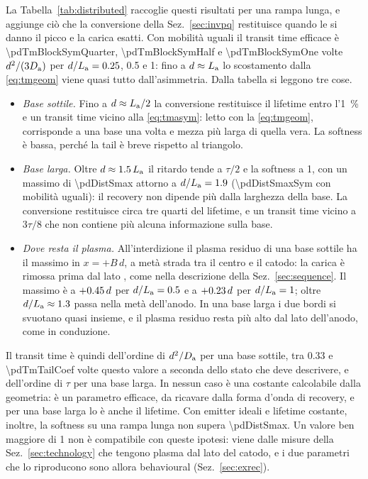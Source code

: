 \documentclass[10pt,a4paper]{scrartcl}
\let\newcommand\pdvaluedefine
\newcommand{\Da}{D_\mathrm{a}}
\newcommand{\La}{L_\mathrm{a}}
\newcommand{\Pp}{p\textsuperscript{+}}
\begin{document}
La Tabella~\ref{tab:distributed} raccoglie questi risultati per una rampa lunga, e aggiunge ciò che la conversione della Sez.~\ref{sec:invpq} restituisce quando le si danno il picco e la carica esatti. Con mobilità uguali il transit time efficace è \num{\pdTmBlockSymQuarter}, \num{\pdTmBlockSymHalf} e \num{\pdTmBlockSymOne} volte $d^2/(3\Da)$ per $d/\La = \num{0.25}$, \num{0.5} e 1: fino a $d \approx \La$ lo scostamento dalla \eqref{eq:tmgeom} viene quasi tutto dall'asimmetria. Dalla tabella si leggono tre cose.
\begin{itemize}
\item \emph{Base sottile.} Fino a $d \approx \La/2$ la conversione restituisce il lifetime entro l'\SI{1}{\percent} e un transit time vicino alla \eqref{eq:tmasym}: letto con la \eqref{eq:tmgeom}, corrisponde a una base una volta e mezza più larga di quella vera. La softness è bassa, perché la tail è breve rispetto al triangolo.
\item \emph{Base larga.} Oltre $d \approx \num{1.5}\,\La$ il ritardo tende a $\tau/2$ e la softness a 1, con un massimo di \num{\pdDistSmax} attorno a $d/\La = \num{\pdDistSmaxBeta}$ (\num{\pdDistSmaxSym} con mobilità uguali): il recovery non dipende più dalla larghezza della base. La conversione restituisce circa tre quarti del lifetime, e un transit time vicino a $3\tau/8$ che non contiene più alcuna informazione sulla base.
\item \emph{Dove resta il plasma.} All'interdizione il plasma residuo di una base sottile ha il massimo in $x = +B\,d$, a metà strada tra il centro e il catodo: la carica è rimossa prima dal lato \Pp, come nella descrizione della Sez.~\ref{sec:sequence}. Il massimo è a $+\num{0.45}\,d$ per $d/\La = \num{0.5}$ e a $+\num{0.23}\,d$ per $d/\La = 1$; oltre $d/\La \approx \num{\pdTmPeakZeroBeta}$ passa nella metà dell'anodo. In una base larga i due bordi si svuotano quasi insieme, e il plasma residuo resta più alto dal lato dell'anodo, come in conduzione.
\end{itemize}

Il transit time è quindi dell'ordine di $d^2/\Da$ per una base sottile, tra \num{0.33} e \num{\pdTmTailCoef} volte questo valore a seconda dello stato che deve descrivere, e dell'ordine di $\tau$ per una base larga. In nessun caso è una costante calcolabile dalla geometria: è un parametro efficace, da ricavare dalla forma d'onda di recovery, e per una base larga lo è anche il lifetime. Con emitter ideali e lifetime costante, inoltre, la softness su una rampa lunga non supera \num{\pdDistSmax}. Un valore ben maggiore di 1 non è compatibile con queste ipotesi: viene dalle misure della Sez.~\ref{sec:technology} che tengono plasma dal lato del catodo, e i due parametri che lo riproducono sono allora behavioural (Sez.~\ref{sec:exrec}).
\end{document}
